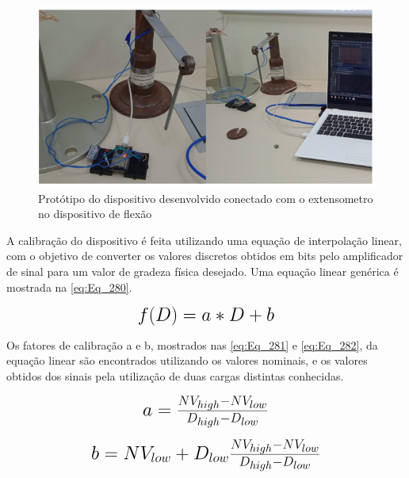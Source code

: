 \begin{figure}[htb]
	\caption{\label{fig:2070} Protótipo do dispositivo desenvolvido conectado com o extensometro no dispositivo de flexão}
	\begin{center}
		\includegraphics[width=\textwidth]{pictures/2070.png}
	\end{center}
\end{figure}

A calibração do dispositivo é feita utilizando uma equação de interpolação linear, com o objetivo de converter os  valores discretos obtidos em bits pelo amplificador
de sinal para um valor de gradeza física desejado.
Uma equação linear genérica é mostrada na \autoref{eq:Eq_280}.

\begin{equation}\label{eq:Eq_280}%
\mbox{\fontsize{17.28}{21.6}\selectfont\( %
f(D) = a * D + b
\)} %
\end{equation}

Os fatores de calibração a e b, mostrados nas \autoref{eq:Eq_281} e \autoref{eq:Eq_282}, da equação linear são encontrados utilizando os valores nominais, e os valores obtidos
dos sinais pela utilização de duas cargas distintas conhecidas.

\begin{equation}\label{eq:Eq_281}%
\mbox{\fontsize{17.28}{21.6}\selectfont\( %
a = \frac{NV_{high} - NV_{low}}{D_{high} - D_{low}}
\)} %
\end{equation}

\begin{equation}\label{eq:Eq_282}%
\mbox{\fontsize{17.28}{21.6}\selectfont\( %
b = NV_{low} + D_{low} \frac{NV_{high} - NV_{low}}{D_{high} - D_{low}}
\)} %
\end{equation}

%
%
%
%
%
%


